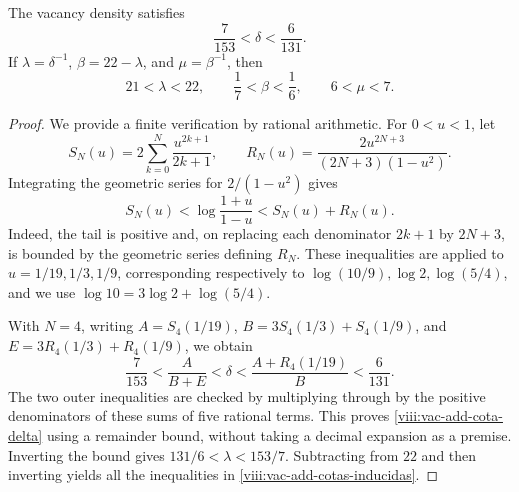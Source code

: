 \begin{lemma}
\label{viii:vac-add-cotas}
The vacancy density satisfies
\begin{equation}
 \frac7{153}<\delta<\frac6{131}.
 \label{viii:vac-add-cota-delta}
\end{equation}
If \(\lambda=\delta^{-1}\), \(\beta=22-\lambda\), and \(\mu=\beta^{-1}\), then
\begin{equation}
 21<\lambda<22,
 \qquad \frac17<\beta<\frac16,
 \qquad 6<\mu<7.
 \label{viii:vac-add-cotas-inducidas}
\end{equation}
\end{lemma}
\begin{proof}
We provide a finite verification by rational arithmetic. For \(0<u<1\), let
\[
 S_N(u)=2\sum_{k=0}^{N}\frac{u^{2k+1}}{2k+1},
 \qquad
 R_N(u)=\frac{2u^{2N+3}}{(2N+3)(1-u^2)}.
\]
Integrating the geometric series for \(2/(1-u^2)\) gives
\[
 S_N(u)<\log\frac{1+u}{1-u}<S_N(u)+R_N(u).
\]
Indeed, the tail is positive and, on replacing each denominator \(2k+1\) by \(2N+3\), is bounded by the geometric series defining \(R_N\). These inequalities are applied to \(u=1/19,1/3,1/9\), corresponding respectively to \(\log(10/9),\log2,\log(5/4)\), and we use \(\log10=3\log2+\log(5/4)\).

With \(N=4\), writing \(A=S_4(1/19)\), \(B=3S_4(1/3)+S_4(1/9)\), and \(E=3R_4(1/3)+R_4(1/9)\), we obtain
\[
 \frac7{153}
 <\frac{A}{B+E}
 <\delta
 <\frac{A+R_4(1/19)}{B}
 <\frac6{131}.
\]
The two outer inequalities are checked by multiplying through by the positive denominators of these sums of five rational terms. This proves \eqref{viii:vac-add-cota-delta} using a remainder bound, without taking a decimal expansion as a premise. Inverting the bound gives \(131/6<\lambda<153/7\). Subtracting from \(22\) and then inverting yields all the inequalities in \eqref{viii:vac-add-cotas-inducidas}.
\end{proof}

